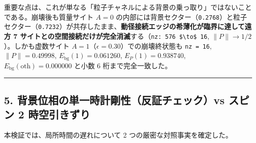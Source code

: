 \documentclass[
  a4paper,
]{ltjsarticle}
\begin{document}
重要な点は、これが単なる「粒子チャネルによる背景の乗っ取り」ではないことである。崩壊後も質量サイト
\(A = 0\)
の内部には背景セクター（\texttt{0.2768}）と粒子セクター（\texttt{0.7232}）が共存したまま、\textbf{動径接続エッジの希薄化が臨界に達して遠方
7
サイトとの空間接続だけが完全消滅}する（\texttt{nz:\ 576\ \$\textbackslash{}to\$\ 16},
\(\|P\| \to 1/2\)）。しかも虚数サイト
\(A = 1\)（\(\epsilon = 0.30\)）での崩壊終状態も \texttt{nz\ =\ 16},
\(\|P\| = 0.49998\), \(E_{\mathrm{bg}}(1) = 0.061260\),
\(E_P(1) = 0.938740\), \(E_{\mathrm{bg}}(\mathrm{oth}) = 0.000000\)
と小数 6 桁まで完全一致した。

\begin{center}\rule{0.5\linewidth}{0.5pt}\end{center}

\subsection{5. 背景位相の単一時計剛性（反証チェック）vs スピン 2
時空引きずり}\label{ux80ccux666fux4f4dux76f8ux306eux5358ux4e00ux6642ux8a08ux525bux6027ux53cdux8a3cux30c1ux30a7ux30c3ux30afvs-ux30b9ux30d4ux30f3-2-ux6642ux7a7aux5f15ux304dux305aux308a}

本検証では、局所時間の遅れについて 2 つの厳密な対照事実を確定した。
\end{document}

